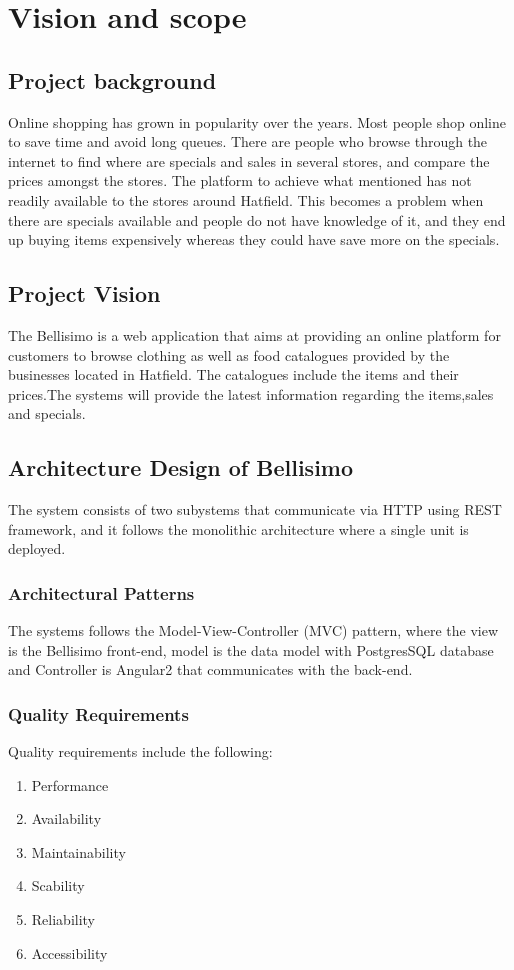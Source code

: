 \documentclass[12pt,a4paper]{article}
\begin{document}


\tableofcontents
\newpage

\section{Vision and scope}
\subsection{Project background}
Online shopping has grown in popularity over the years. Most people shop online to save time and avoid long queues. There are people who browse through the internet to find where are specials and sales in several stores, and compare the prices amongst the stores. The platform to achieve what mentioned has not readily available to the stores around Hatfield. This becomes a problem when there are specials available and people do not have knowledge of it, and they end up buying items expensively whereas they could have save more on the specials. 
\subsection{Project Vision}
The Bellisimo is a web application that aims at providing an online platform for customers to browse clothing as well as food
catalogues provided by the businesses located in Hatfield. The catalogues include the items and their prices.The systems will provide the latest information regarding the items,sales and specials.

\subsection{Architecture Design of Bellisimo}
The system consists of two subystems that communicate via HTTP using REST framework, and it follows the monolithic architecture where a single unit is deployed.
	\subsubsection{Architectural Patterns}
	The systems follows the Model-View-Controller (MVC) pattern, where the view is the Bellisimo front-end, model is the data model with PostgresSQL database and Controller is Angular2 that communicates with the back-end.
	\subsubsection{Quality Requirements}
	Quality requirements include the following: \newline
	\begin{enumerate}[label=(\alph*)]
	\item Performance
	\item Availability
	\item Maintainability
	\item Scability
	\item Reliability
	\item Accessibility
	\end{enumerate}
	
\end{document}
